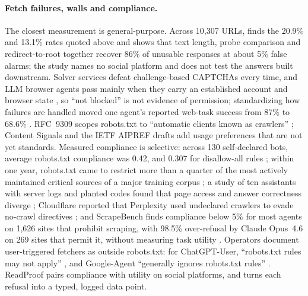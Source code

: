 \documentclass[11pt]{article}
\begin{document}
\paragraph{Fetch failures, walls and compliance.}
The closest measurement is general-purpose. Across 10{,}307 URLs, \citet{zhang2026silent} finds the 20.9\%
and 13.1\% rates quoted above and shows that text length, probe comparison and redirect-to-root together
recover 86\% of unusable responses at about 5\% false alarms; the study names no social platform and does
not test the answers built downstream. Solver services defeat challenge-based CAPTCHAs every time, and LLM
browser agents pass mainly when they carry an established account and browser state
\citep{ousat2026brokengates}, so ``not blocked'' is not evidence of permission; standardizing how failures
are handled moved one agent's reported web-task success from 87\% to 68.6\% \citep{akkil2026emergence}.
RFC~9309 scopes robots.txt to ``automatic clients known as crawlers'' \citep{rfc9309}; Content Signals
\citep{cloudflare2025contentsignals} and the IETF AIPREF drafts \citep{ietf2026aiprefvocab,ietf2026aiprefattach}
add usage preferences that are not yet standards. Measured compliance is selective: across 130 self-declared
bots, average robots.txt compliance was 0.42, and 0.307 for disallow-all rules \citep{kim2025scrapers}; within
one year, robots.txt came to restrict more than a quarter of the most actively maintained critical sources of
a major training corpus \citep{longpre2024consent}; a study of ten assistants with server logs and planted
codes found that page access and answer correctness diverge \citep{lopezfonseca2026robots}; Cloudflare reported
that Perplexity used undeclared crawlers to evade no-crawl directives \citep{cloudflare2025perplexity}; and
ScrapeBench finds compliance below 5\% for most agents on 1{,}626 sites that prohibit scraping, with 98.5\%
over-refusal by Claude Opus~4.6 on 269 sites that permit it, without measuring task utility
\citep{imperial2026scrapebench}. Operators document user-triggered fetchers as outside robots.txt: for
ChatGPT-User, ``robots.txt rules may not apply'' \citep{openai2026crawlers}, and Google-Agent ``generally
ignores robots.txt rules'' \citep{tollbit2026googleagent}. ReadProof pairs compliance with utility on social
platforms, and turns each refusal into a typed, logged data point.
\end{document}
